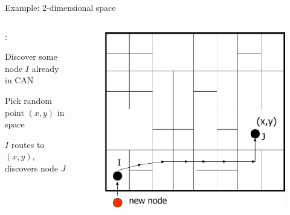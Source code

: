 \begin{frame}{Example: 2-dimensional space}

\begin{columns}
\begin{column}{0.5\textwidth}
:\\
\BE
\item Discover some node $I$ already in CAN
\item Pick random point $(x,y)$ in space
\item $I$ routes to $(x,y)$, discovers node $J$ 
\EE
\end{column}
\begin{column}{0.5\textwidth}
\begin{figure}
	\includegraphics[width=1.0\textwidth]{can-join1}
\end{figure}
\end{column}
\end{columns}

\end{frame}

